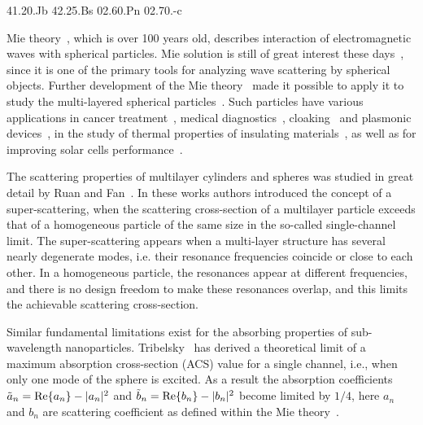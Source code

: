 \documentclass[aps,prl,twocolumn,showpacs,superscriptaddress,groupedaddress]{revtex4-1}
\begin{document}
\pacs%
{41.20.Jb 42.25.Bs 02.60.Pn 02.70.-c}

\maketitle %

Mie theory~\cite{Mie-1908}, which is over 100 years old, describes
interaction of electromagnetic waves with spherical particles. Mie
solution is still of great interest these days~\cite{Suzuki-2008,MacKowski-2012,Lerme-2000,Xu-2005,Li-2006,Gogoi-2010,Santiago-2011},
since it is one of the primary tools for analyzing wave scattering by
spherical objects. Further development of the Mie
theory~\cite{Yang-2003, Pena-scattnlay-2009} made it possible to apply
it to study the multi-layered spherical
particles~\cite{Sheehan-2013,Selmke-2012}.  Such particles have
various applications in cancer treatment~\cite{Zhang-2010,
  Hirsch-2003}, medical diagnostics~\cite{Allain-2002},
cloaking~\cite{Qui-2009, Semouchkina-2013, Ladutenko-2014} and
plasmonic devices~\cite{Martin-2013, Alu-2005}, in the study of thermal properties of insulating materials~\cite{Xie-2013}, as well as for improving solar cells performance~\cite{Kameya-2011,Mann-2011}.

The scattering properties of multilayer cylinders and spheres was
studied in great detail by Ruan and Fan~\cite{Fan-2010,Fan-2011}.  In
these works authors introduced the concept of a super-scattering, when
the scattering cross-section of a multilayer particle exceeds that of
a homogeneous particle of the same size in the so-called
single-channel limit. The super-scattering appears when a
multi-layer structure has several nearly degenerate modes,
i.e. their resonance frequencies coincide or close to each other. In a homogeneous particle, the resonances appear at different frequencies, and there is no design freedom to make these resonances overlap, and this limits the
achievable scattering cross-section.

Similar fundamental limitations exist for the absorbing properties of
sub-wavelength nanoparticles.  Tribelsky~\cite{Tribelsky-2011} has
derived a theoretical limit of a maximum absorption cross-section
(ACS) value for a single channel, i.e., when only one mode of the
sphere is excited.  As a result the absorption coefficients
$\tilde{a}_n= {\rm Re}\{a_n\} - |a_n|^2 $ and $\tilde{b}_n= {\rm
  Re}\{b_n\} - |b_n|^2 $ become limited by $1/4$, here $a_n$ and $b_n$
are scattering coefficient as defined within the Mie
theory~\cite{Bohren-1983}.
\end{document}
